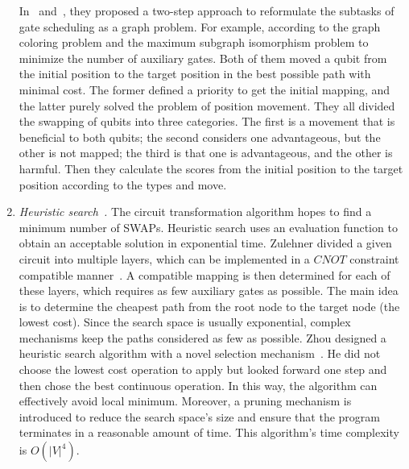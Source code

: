 \documentclass[runningheads]{llncs}
\begin{document}
\begin{enumerate}
	In~\cite{Guerreschi2018} and~\cite{Matsuo2019}, they proposed a two-step approach to reformulate the subtasks of gate scheduling as a graph problem. For example, according to the graph coloring problem and the maximum subgraph isomorphism problem to minimize the number of auxiliary gates. Both of them moved a qubit from the initial position to the target position in the best possible path with minimal cost. The former defined a priority to get the initial mapping, and the latter purely solved the problem of position movement. They all divided the swapping of qubits into three categories. The first is a movement that is beneficial to both qubits; the second considers one advantageous, but the other is not mapped; the third is that one is advantageous, and the other is harmful. Then they calculate the scores from the initial position to the target position according to the types and move.
	\item \emph{Heuristic search~\cite{Zulehner2017,Cowtan2019,Li2018,Xiangzhen2020,2018QubitSiraichi}.}
	The circuit transformation algorithm hopes to find a minimum number of SWAPs. Heuristic search uses an evaluation function to obtain an acceptable solution in exponential time. Zulehner divided a given circuit into multiple layers, which can be implemented in a $CNOT$ constraint compatible manner~\cite{Zulehner2017}. A compatible mapping is then determined for each of these layers, which requires as few auxiliary gates as possible. The main idea is to determine the cheapest path from the root node to the target node (the lowest cost). Since the search space is usually exponential, complex mechanisms keep the paths considered as few as possible. Zhou designed a heuristic search algorithm with a novel selection mechanism~\cite{Xiangzhen2020}. He did not choose the lowest cost operation to apply but looked forward one step and then chose the best continuous operation. In this way, the algorithm can effectively avoid local minimum. Moreover, a pruning mechanism is introduced to reduce the search space's size and ensure that the program terminates in a reasonable amount of time. This algorithm's time complexity is $O(|V|^{4})$.


\end{enumerate}
\end{document}
